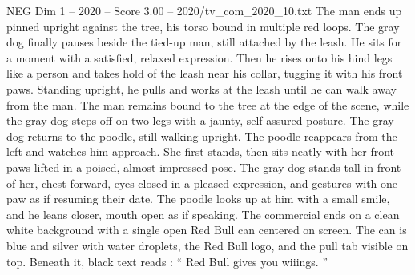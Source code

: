 \begin{textsample}{NEG Dim 1 – 2020 – Score 3.00 – 2020/tv\_com\_2020\_10.txt}
The man ends up pinned upright against the tree, his torso bound in multiple red loops.
The gray dog finally pauses beside the tied-up man, still attached by the leash.
He sits for a moment with a satisfied, relaxed expression.
Then he rises onto his hind legs like a person and takes hold of the leash near his collar, tugging it with his front paws.
Standing upright, he pulls and works at the leash until he can walk away from the man.
The man remains bound to the tree at the edge of the scene, while the gray dog steps off on two legs with a jaunty, self-assured posture.
The gray dog returns to the poodle, still walking upright.
The poodle reappears from the left and watches him approach.
She first stands, then sits neatly with her front paws lifted in a poised, almost impressed pose.
The gray dog stands tall in front of her, chest forward, eyes closed in a pleased expression, and gestures with one paw as if resuming their date.
The poodle looks up at him with a small smile, and he leans closer, mouth open as if speaking.
The commercial ends on a clean white background with a single open Red Bull can centered on screen.
The can is blue and silver with water droplets, the Red Bull logo, and the pull tab visible on top.
Beneath it, black text reads : “ Red Bull gives you wiiings. ”

\end{textsample}
